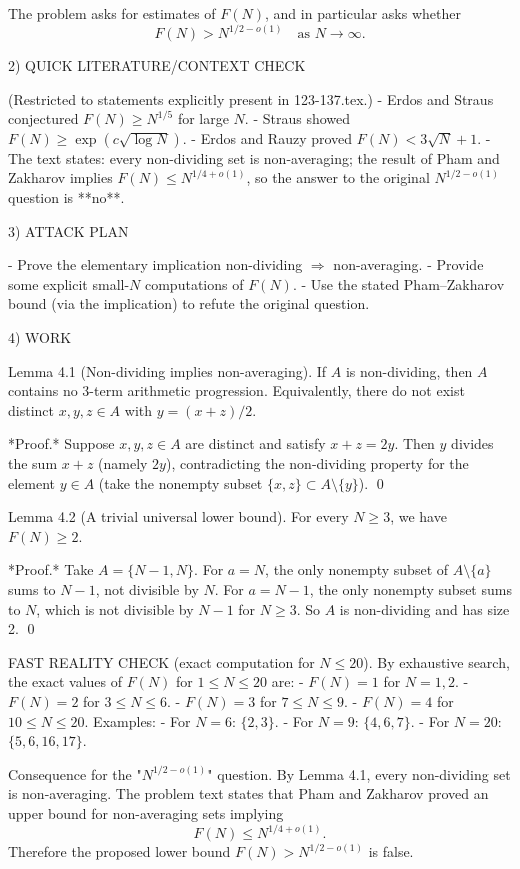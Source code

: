 The problem asks for estimates of $F(N)$, and in particular asks whether
\[
F(N) > N^{1/2-o(1)}\quad\text{as }N\to\infty.
\]

2) QUICK LITERATURE/CONTEXT CHECK

(Restricted to statements explicitly present in 123-137.tex.)
- Erdos and Straus conjectured $F(N)\ge N^{1/5}$ for large $N$.
- Straus showed $F(N)\ge \exp(c\sqrt{\log N})$.
- Erdos and Rauzy proved $F(N)<3\sqrt{N}+1$.
- The text states: every non-dividing set is non-averaging; the result of Pham and Zakharov implies $F(N)\le N^{1/4+o(1)}$, so the answer to the original $N^{1/2-o(1)}$ question is **no**.

3) ATTACK PLAN

- Prove the elementary implication non-dividing $\Rightarrow$ non-averaging.
- Provide some explicit small-$N$ computations of $F(N)$.
- Use the stated Pham--Zakharov bound (via the implication) to refute the original question.

4) WORK

Lemma 4.1 (Non-dividing implies non-averaging).
If $A$ is non-dividing, then $A$ contains no 3-term arithmetic progression.
Equivalently, there do not exist distinct $x,y,z\in A$ with $y=(x+z)/2$.

*Proof.* Suppose $x,y,z\in A$ are distinct and satisfy $x+z=2y$.
Then $y$ divides the sum $x+z$ (namely $2y$), contradicting the non-dividing property for the element $y\in A$ (take the nonempty subset $\{x,z\}\subset A\setminus\{y\}$). \qed

Lemma 4.2 (A trivial universal lower bound).
For every $N\ge 3$, we have $F(N)\ge 2$.

*Proof.* Take $A=\{N-1,N\}$.
For $a=N$, the only nonempty subset of $A\setminus\{a\}$ sums to $N-1$, not divisible by $N$.
For $a=N-1$, the only nonempty subset sums to $N$, which is not divisible by $N-1$ for $N\ge 3$.
So $A$ is non-dividing and has size 2. \qed

FAST REALITY CHECK (exact computation for $N\le 20$).
By exhaustive search, the exact values of $F(N)$ for $1\le N\le 20$ are:
- $F(N)=1$ for $N=1,2$.
- $F(N)=2$ for $3\le N\le 6$.
- $F(N)=3$ for $7\le N\le 9$.
- $F(N)=4$ for $10\le N\le 20$.
Examples:
- For $N=6$: $\{2,3\}$.
- For $N=9$: $\{4,6,7\}$.
- For $N=20$: $\{5,6,16,17\}$.

Consequence for the "$N^{1/2-o(1)}$" question.
By Lemma 4.1, every non-dividing set is non-averaging.
The problem text states that Pham and Zakharov proved an upper bound for non-averaging sets implying
\[
F(N)\le N^{1/4+o(1)}.
\]
Therefore the proposed lower bound $F(N)>N^{1/2-o(1)}$ is false.

